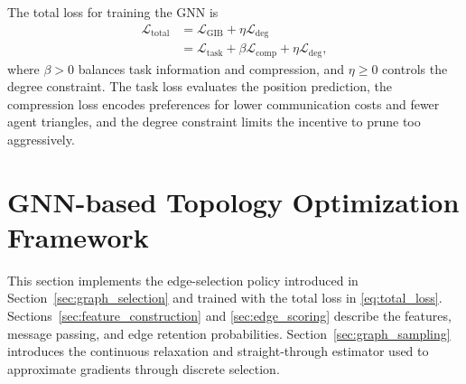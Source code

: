 {The total loss for training the GNN is
\begin{equation}
    \begin{aligned}
    \mathcal L_{\mathrm{total}}
    &=
    \mathcal L_{\mathrm{GIB}}
    +\eta\mathcal L_{\mathrm{deg}}\\
    &=
    \mathcal L_{\mathrm{task}}
    +\beta\mathcal L_{\mathrm{comp}}
    +\eta\mathcal L_{\mathrm{deg}},
    \end{aligned}
    \label{eq:total_loss}
\end{equation}
where $\beta>0$ balances task information and compression, and $\eta\ge0$ controls the degree constraint. The task loss evaluates the position prediction, the compression loss encodes preferences for lower communication costs and fewer agent triangles, and the degree constraint limits the incentive to prune too aggressively.

}


\section{GNN-based Topology Optimization Framework}
\label{sec:gnn_framework}
This section implements the edge-selection policy introduced in Section~\ref{sec:graph_selection} and trained with the total loss in \eqref{eq:total_loss}. Sections~\ref{sec:feature_construction} and \ref{sec:edge_scoring} describe the features, message passing, and edge retention probabilities. Section~\ref{sec:graph_sampling} introduces the continuous relaxation and straight-through estimator used to approximate gradients through discrete selection.


